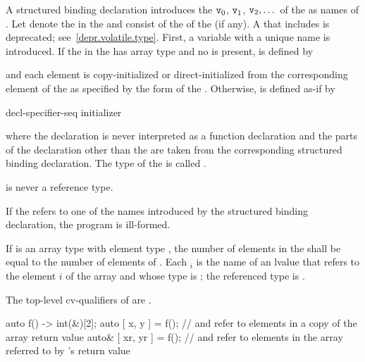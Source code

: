 \pnum
A structured binding declaration introduces the 
$\texttt{v}_0$, $\texttt{v}_1$, $\texttt{v}_2, \dotsc$
of the
 as names
of .
Let \cv{} denote the  in
the  and
 consist of the  of
the  (if any).
A \cv{} that includes  is deprecated;
see~\ref{depr.volatile.type}.
First, a variable with a unique name  is introduced. If the
 in the 
has array type  and no  is present,
 is defined by
\begin{ncbnf}
  \cv{}   \terminal{;}
\end{ncbnf}
and each element is copy-initialized or direct-initialized
from the corresponding element of the  as specified
by the form of the .
Otherwise, 
is defined as-if by
\begin{ncbnf}
 decl-specifier-seq   initializer \terminal{;}
\end{ncbnf}
where
the declaration is never interpreted as a function declaration and
the parts of the declaration other than the  are taken
from the corresponding structured binding declaration.
The type of the 
 is called .
\begin{note}
 is never a reference type.
\end{note}

\pnum
If the  refers to
one of the names introduced by the structured binding declaration,
the program is ill-formed.

\pnum
If  is an array type with element type , the number
of elements in the  shall be equal to the
number of elements of . Each $_i$ is the name of an
lvalue that refers to the element $i$ of the array and whose type
is ; the referenced type is .
\begin{note}
The top-level cv-qualifiers of  are \cv.
\end{note}
\begin{example}
\begin{codeblock}
auto f() -> int(&)[2];
auto [ x, y ] = f();            //  and  refer to elements in a copy of the array return value
auto& [ xr, yr ] = f();         //  and  refer to elements in the array referred to by 's return value
\end{codeblock}
\end{example}

